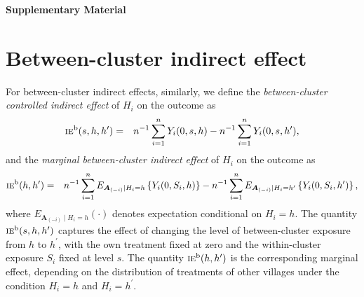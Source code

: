 \documentclass{article}
\newcommand{\bA}{\boldsymbol{A}}
\newcommand{\sumi}{\sum_{i=1}^n}
\newcommand{\ie}{\textsc{ie}}
\begin{document}







\newpage 
\appendix

\renewcommand{\thesection}{\Alph{section}}
\renewcommand{\thetheorem}{\Alph{section}.\arabic{theorem}}
\setcounter{theorem}{0}
\renewcommand{\thelemma}{\Alph{section}.\arabic{lemma}}
\setcounter{lemma}{0}
\renewcommand{\theproposition}{\Alph{section}.\arabic{proposition}}
\setcounter{proposition}{0}
\renewcommand{\thecorollary}{\Alph{section}.\arabic{corollary}}
\setcounter{corollary}{0}
\renewcommand{\thedefinition}{\Alph{section}.\arabic{definition}}
\setcounter{definition}{0}
\renewcommand{\thepage}{S\arabic{page}}
\setcounter{page}{1}
\renewcommand{\theequation}{\Alph{section}.\arabic{equation}}
\setcounter{equation}{0}
\renewcommand{\thetable}{S\arabic{table}}
\setcounter{table}{0}

\begin{center}
  \LARGE {\bf Supplementary Material}
\end{center}

\section{Between-cluster indirect effect}
For between-cluster indirect effects, similarly, we define the \textit{between-cluster controlled indirect effect} of $H_{i}$ on the outcome as
\begin{eqnarray*}
    \ie^{\textup{b}}(s,h,h^{\prime}) &=& n^{-1}\sumi Y_{i}(0,s,h) - n^{-1}\sumi Y_{i}(0,s,h^{\prime}),
\end{eqnarray*}
and the \textit{marginal between-cluster indirect effect} of $H_{i}$ on the outcome as
\begin{eqnarray*}
    \ie^{\textup{b}}(h,h^{\prime}) &=& n^{-1}\sumi E_{\bA_{(-i)}\mid H_{i} = h}\left\{Y_{i}(0,S_{i},h)\right\} - n^{-1}\sumi E_{\bA_{(-i)}\mid H_{i} = h^{\prime}}\left\{Y_{i}(0,S_{i},h^{\prime})\right\},
\end{eqnarray*}
where $E_{\bA_{(-i)}\mid H_{i} = h}(\cdot)$ denotes expectation conditional on $H_{i}=h$. The quantity $\ie^{\textup{b}}(s,h,h^{\prime})$ captures the effect of changing the level of between-cluster exposure from $h$ to $h^{\prime}$, with the own treatment fixed at zero and the within-cluster exposure $S_{i}$ fixed at level $s$. The quantity $\ie^{\textup{b}}(h,h^{\prime})$ is the corresponding marginal effect, depending on the distribution of treatments of other villages under the condition $H_{i}=h$ and $H_{i}=h^{\prime}$.
\end{document}
